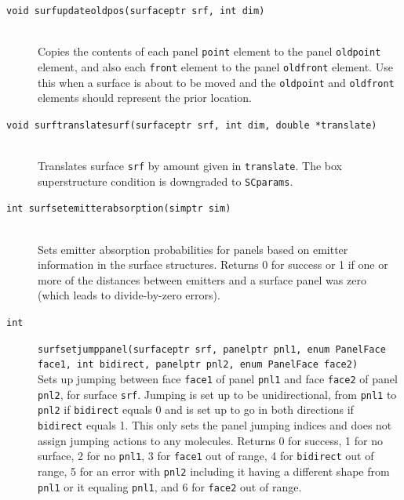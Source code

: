 \documentclass {scrbook}
\newcommand {\ttt} {\texttt}
\begin{document}
\begin{description}
\item[\ttt{void surfupdateoldpos(surfaceptr srf, int dim)}]
\hfill \\
Copies the contents of each panel \ttt{point} element to the panel \ttt{oldpoint} element, and also each \ttt{front} element to the panel \ttt{oldfront} element. Use this when a surface is about to be moved and the \ttt{oldpoint} and \ttt{oldfront} elements should represent the prior location.

\item[\ttt{void surftranslatesurf(surfaceptr srf, int dim, double *translate)}]
\hfill \\
Translates surface \ttt{srf} by amount given in \ttt{translate}. The box superstructure condition is downgraded to \ttt{SCparams}.

\item[\ttt{int surfsetemitterabsorption(simptr sim)}]
\hfill \\
Sets emitter absorption probabilities for panels based on emitter information in the surface structures. Returns 0 for success or 1 if one or more of the distances between emitters and a surface panel was zero (which leads to divide-by-zero errors).

\item[\ttt{int}]
\ttt{surfsetjumppanel(surfaceptr srf, panelptr pnl1, enum PanelFace face1, int bidirect, panelptr pnl2, enum PanelFace face2)}
\hfill \\
Sets up jumping between face \ttt{face1} of panel \ttt{pnl1} and face \ttt{face2} of panel \ttt{pnl2}, for surface \ttt{srf}. Jumping is set up to be unidirectional, from \ttt{pnl1} to \ttt{pnl2} if \ttt{bidirect} equals 0 and is set up to go in both directions if \ttt{bidirect} equals 1. This only sets the panel jumping indices and does not assign jumping actions to any molecules. Returns 0 for success, 1 for no surface, 2 for no \ttt{pnl1}, 3 for \ttt{face1} out of range, 4 for \ttt{bidirect} out of range, 5 for an error with \ttt{pnl2} including it having a different shape from \ttt{pnl1} or it equaling \ttt{pnl1}, and 6 for \ttt{face2} out of range.


\end{description}
\end{document}
